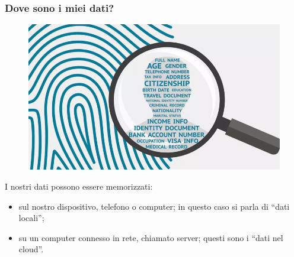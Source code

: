 \documentclass[handout]{beamer}
\begin{document}
\begin{frame}
\frametitle{Dove sono i miei dati?}
\begin{figure}
  \includegraphics[width=.6\columnwidth]{img/datipers.png}
\end{figure}

I nostri dati possono essere memorizzati:

\begin{itemize}
  \item \alert{sul nostro dispositivo}, telefono o computer; in questo caso si parla di \alert{``dati locali''};\pause
  \item \alert{su un computer connesso in rete}, chiamato server; questi sono i \alert{``dati nel cloud''}.
\end{itemize}
\end{frame}
\end{document}
